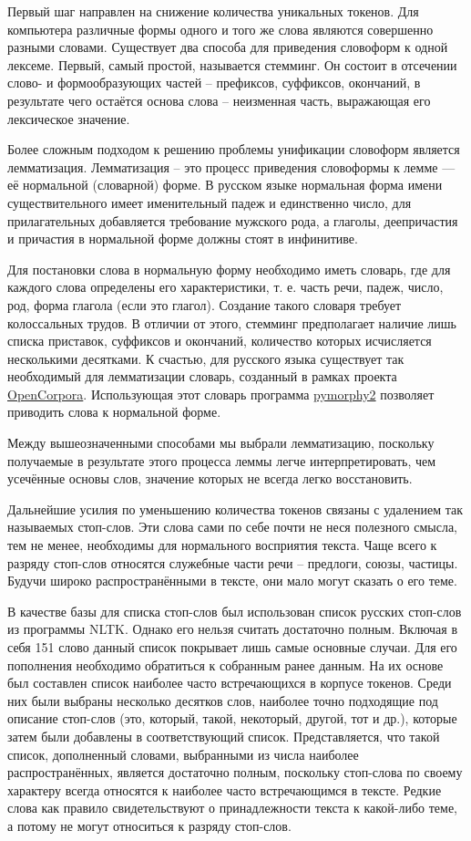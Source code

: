 Первый шаг направлен на снижение количества уникальных токенов. Для компьютера различные формы одного и того же слова являются совершенно разными словами. Существует два способа для приведения словоформ к одной лексеме. Первый, самый простой, называется стемминг. Он состоит в отсечении слово- и формообразующих частей -- префиксов, суффиксов, окончаний, в результате чего остаётся основа слова -- неизменная часть, выражающая его лексическое значение.

Более сложным подходом к решению проблемы унификации словоформ является лемматизация. Лемматизация -- это процесс приведения словоформы к лемме — её нормальной (словарной) форме. В русском языке нормальная форма имени существительного имеет именительный падеж и единственно число, для прилагательных добавляется требование мужского рода, а глаголы, деепричастия и причастия в нормальной форме должны стоят в инфинитиве.

Для постановки слова в нормальную форму необходимо иметь словарь, где для каждого слова определены его характеристики, т. е. часть речи, падеж, число, род, форма глагола (если это глагол). Создание такого словаря требует колоссальных трудов. В отличии от этого, стемминг предполагает наличие лишь списка приставок, суффиксов и окончаний, количество которых исчисляется несколькими десятками. К счастью, для русского языка существует так необходимый для лемматизации словарь, созданный в рамках проекта \href{http://opencorpora.org/}{OpenCorpora}. Использующая этот словарь программа \href{https://pymorphy2.readthedocs.org/}{pymorphy2} позволяет приводить слова к нормальной форме.

Между вышеозначенными способами мы выбрали лемматизацию, поскольку получаемые в результате этого процесса леммы легче интерпретировать, чем усечённые основы слов, значение которых не всегда легко восстановить.

Дальнейшие усилия по уменьшению количества токенов связаны с удалением так называемых стоп-слов. Эти слова сами по себе почти не неся полезного смысла, тем не менее, необходимы для нормального восприятия текста. Чаще всего к разряду стоп-слов относятся служебные части речи -- предлоги, союзы, частицы. Будучи широко распространёнными в тексте, они мало могут сказать о его теме.

В качестве базы для списка стоп-слов был использован список русских стоп-слов из программы NLTK. Однако его нельзя считать достаточно полным. Включая в себя 151 слово данный список покрывает лишь самые основные случаи. Для его пополнения необходимо обратиться к собранным ранее данным. На их основе был составлен список наиболее часто встречающихся в корпусе токенов. Среди них были выбраны несколько десятков слов, наиболее точно подходящие под описание стоп-слов (это, который, такой, некоторый, другой, тот и др.), которые затем были добавлены в соответствующий список. Представляется, что такой список, дополненный словами, выбранными из числа наиболее распространённых, является достаточно полным, поскольку стоп-слова по своему характеру всегда относятся к наиболее часто встречающимся в тексте. Редкие слова как правило свидетельствуют о принадлежности текста к какой-либо теме, а потому не могут относиться к разряду стоп-слов.

